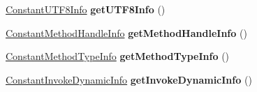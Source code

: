 \begin{DoxyCompactItemize}
\item 
\hyperlink{structConstantUTF8Info}{Constant\+U\+T\+F8\+Info} {\bfseries get\+U\+T\+F8\+Info} ()\hypertarget{classCPInfo_a0f40798aeacc26f85a901fc7244687a1}{}\label{classCPInfo_a0f40798aeacc26f85a901fc7244687a1}

\item 
\hyperlink{structConstantMethodHandleInfo}{Constant\+Method\+Handle\+Info} {\bfseries get\+Method\+Handle\+Info} ()\hypertarget{classCPInfo_ac8c8db8663473d3ee4074ee67f30c058}{}\label{classCPInfo_ac8c8db8663473d3ee4074ee67f30c058}

\item 
\hyperlink{structConstantMethodTypeInfo}{Constant\+Method\+Type\+Info} {\bfseries get\+Method\+Type\+Info} ()\hypertarget{classCPInfo_a35c31d16b5c67a7293b15a1f1613099a}{}\label{classCPInfo_a35c31d16b5c67a7293b15a1f1613099a}

\item 
\hyperlink{structConstantInvokeDynamicInfo}{Constant\+Invoke\+Dynamic\+Info} {\bfseries get\+Invoke\+Dynamic\+Info} ()\hypertarget{classCPInfo_a11f6eeeb39bf257a303ff640d3072bca}{}\label{classCPInfo_a11f6eeeb39bf257a303ff640d3072bca}

\end{DoxyCompactItemize}
